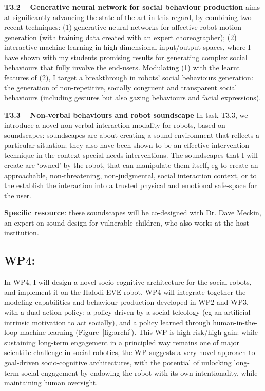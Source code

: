 \textbf{T3.2 -- Generative neural network for social behaviour production}
\project aims at significantly advancing the state of the art in this regard, by
combining two recent techniques: (1) generative neural networks for affective
robot motion generation (with
training data created with an expert choreographer); (2) interactive machine
learning in high-dimensional input/output spaces, where I have shown with my
students promising results for generating complex social
behaviours that fully involve the
end-users. Modulating (1) with the learnt features of
(2), I target a breakthrough in robots' social behaviours generation: the
generation of non-repetitive, socially congruent and transparent social
behaviours (including gestures but also gazing behaviours and facial
expressions).

\textbf{T3.3 -- Non-verbal behaviours and robot soundscape} In task T3.3, we
introduce a novel non-verbal interaction modality for robots, based on
soundscapes: soundscapes are about creating a sound environment that reflects a
particular situation; they also have been shown to be an effective intervention
technique in the context special needs
interventions. The soundscapes that I will create
are `owned' by the robot, that can manipulate them itself, eg to create an
approachable, non-threatening, non-judgmental, social interaction context, or to
the establish the interaction into a trusted physical and emotional safe-space
for the user.

\textbf{Specific resource}: these soundscapes will be co-designed with Dr.
Dave Meckin, an expert on sound design for vulnerable children, who also works
at the host institution.

\subsection{WP4: \textbf{\wpFour}}

In WP4, I will design a novel socio-cognitive architecture for the social
robots, and implement it on the Halodi EVE robot.  WP4 will integrate together the
modeling capabilities and behaviour production developed in WP2 and WP3, with a
dual action policy: a policy driven by a social teleology (eg an artificial
intrinsic motivation to act socially), and a policy learned through
human-in-the-loop machine learning (Figure~\ref{fig:archi}). This WP is high-risk/high-gain: while sustaining
long-term engagement in a principled way remains one of major scientific
challenge in social robotics, the WP suggests a very novel
approach to goal-driven socio-cognitive architectures, with the potential of
unlocking long-term social engagement by endowing the robot with its own
intentionality, while maintaining human oversight.

